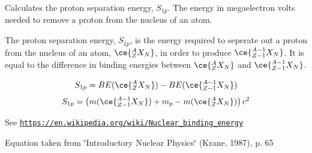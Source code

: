 Calculates the proton separation energy, $S_{1p}$. The energy in megaelectron volts needed to remove a proton from the nucleus of an atom. 

The proton separation energy, $S_{1p}$, is the energy required to seperate out a proton from the nucleus of an atom, $\ce{ ^{A}_{Z}X_{N} }$, in order to produce $\ce{ ^{A-1}_{Z-1}X_{N} }$. It is equal to the difference in binding energies between $\ce{ ^{A}_{Z}X_{N} }$ and $\ce{ ^{A-1}_{Z-1}X_{N} }$.

\[S_{1p} = BE(\ce{ ^{A}_{Z}X_{N} }) - BE(\ce{ ^{A-1}_{Z-1}X_{N} })\] \[S_{1p} = \left ( m(\ce{ ^{A-1}_{Z-1}X_{N} }) + m_p - m(\ce{ ^{A}_{Z}X_{N} }) \right ) c^2\]

See \href{https://en.wikipedia.org/wiki/Nuclear_binding_energy}{\tt https\+://en.\+wikipedia.\+org/wiki/\+Nuclear\+\_\+binding\+\_\+energy}

Equation taken from \char`\"{}\+Introductory Nuclear Physics\char`\"{} (Krane, 1987), p. 65


